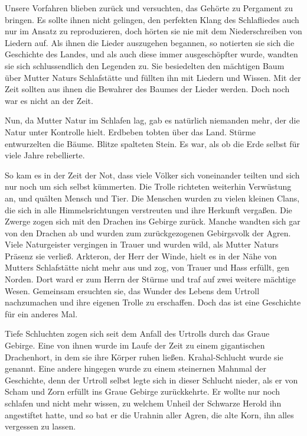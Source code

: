 \documentclass[10pt, a4paper, oneside]{book}
\begin{document}
Unsere Vorfahren blieben zurück und versuchten, das Gehörte zu Pergament zu bringen. Es sollte ihnen nicht gelingen, den perfekten Klang des Schlafliedes auch nur im Ansatz zu reproduzieren, doch hörten sie nie mit dem Niederschreiben von Liedern auf. Als ihnen die Lieder auszugehen begannen, so notierten sie sich die Geschichte des Landes, und als auch diese immer ausgeschöpfter wurde, wandten sie sich schlussendlich den Legenden zu. Sie besiedelten den mächtigen Baum über Mutter Naturs Schlafstätte und füllten ihn mit Liedern und Wissen. Mit der Zeit sollten aus ihnen die Bewahrer des Baumes der Lieder werden. Doch noch war es nicht an der Zeit.

Nun, da Mutter Natur im Schlafen lag, gab es natürlich niemanden mehr, der die Natur unter Kontrolle hielt. Erdbeben tobten über das Land. Stürme entwurzelten die Bäume. Blitze spalteten Stein. Es war, als ob die Erde selbst für viele Jahre rebellierte.

So kam es in der Zeit der Not, dass viele Völker sich voneinander teilten und sich nur noch um sich selbst kümmerten. Die Trolle richteten weiterhin Verwüstung an, und quälten Mensch und Tier. Die Menschen wurden zu vielen kleinen Clans, die sich in alle Himmelsrichtungen verstreuten und ihre Herkunft vergaßen. Die Zwerge zogen sich mit den Drachen ins Gebirge zurück. Manche wandten sich gar von den Drachen ab und wurden zum zurückgezogenen Gebirgsvolk der Agren. Viele Naturgeister vergingen in Trauer und wurden wild, als Mutter Naturs Präsenz sie verließ. Arkteron, der Herr der Winde, hielt es in der Nähe von Mutters Schlafstätte nicht mehr aus und zog, von Trauer und Hass erfüllt, gen Norden. Dort ward er zum Herrn der Stürme und traf auf zwei weitere mächtige Wesen. Gemeinsam ersuchten sie, das Wunder des Lebens dem Urtroll nachzumachen und ihre eigenen Trolle zu erschaffen. Doch das ist eine Geschichte für ein anderes Mal.

Tiefe Schluchten zogen sich seit dem Anfall des Urtrolls durch das Graue Gebirge. Eine von ihnen wurde im Laufe der Zeit zu einem gigantischen Drachenhort, in dem sie ihre Körper ruhen ließen. Krahal-Schlucht wurde sie genannt. Eine andere hingegen wurde zu einem steinernen Mahnmal der Geschichte, denn der Urtroll selbst legte sich in dieser Schlucht nieder, als er von Scham und Zorn erfüllt ins Graue Gebirge zurückkehrte. Er wollte nur noch schlafen und nicht mehr wissen, zu welchem Unheil der Schwarze Herold ihn angestiftet hatte, und so bat er die Urahnin aller Agren, die alte Korn, ihn alles vergessen zu lassen.
\end{document}
